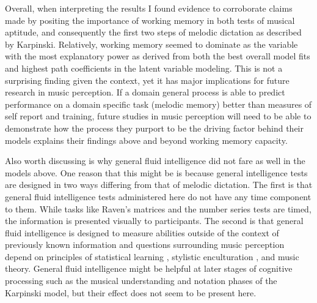 \documentclass[12pt,]{book}
\begin{document}
Overall, when interpreting the results I found evidence to corroborate claims made by \citet{berzWorkingMemoryMusic1995} positing the importance of working memory in both tests of musical aptitude, and consequently the first two steps of melodic dictation as described by Karpinski.
Relatively, working memory seemed to dominate as the variable with the most explanatory power as derived from both the best overall model fits and highest path coefficients in the latent variable modeling.
This is not a surprising finding given the context, yet it has major implications for future research in music perception.
If a domain general process is able to predict performance on a domain specific task (melodic memory) better than measures of self report and training, future studies in music perception will need to be able to demonstrate how the process they purport to be the driving factor behind their models explains their findings above and beyond working memory capacity.

Also worth discussing is why general fluid intelligence did not fare as well in the models above.
One reason that this might be is because general intelligence tests are designed in two ways differing from that of melodic dictation.
The first is that general fluid intelligence tests administered here do not have any time component to them.
While tasks like Raven's matrices \citep{ravenManualRavenProgressive1994} and the number series \citep{thurstonePrimaryMentalAbilities1938} tests are timed, the information is presented visually to participants.
The second is that general fluid intelligence is designed to measure abilities outside of the context of previously known information \citep{cattellAbilitiesTheirGrowth1971} and questions surrounding music perception depend on principles of statistical learning \citep{huronSweetAnticipation2006, pearceStatisticalLearningProbabilistic2018a, saffranStatisticalLearningTone1999}, stylistic enculturation \citep{demorestLostTranslationEnculturation2008, eerolaExpectancySamiYoiks2009, meyerEmotionMeaningMusic1956}, and music theory.
General fluid intelligence might be helpful at later stages of cognitive processing such as the musical understanding and notation phases of the Karpinski model, but their effect does not seem to be present here.
\end{document}

